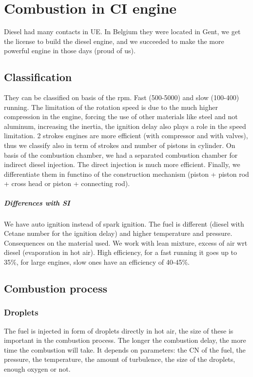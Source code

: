 
\chapter{Combustion in CI engine}
	Diesel had many contacts in UE. In Belgium they were located in Gent, we get the license to build the diesel engine, and we succeeded to make the more powerful engine in those days (proud of us). 
	
\section{Classification}
	They can be classified on basis of the rpm. Fast (500-5000) and slow (100-400) running. The limitation of the rotation speed is due to the much higher compression in the engine, forcing the use of other materials like steel and not aluminum, increasing the inertia, the ignition delay also plays a role in the speed limitation. 2 strokes engines are more efficient (with compressor and with valves), thus we classify also in term of strokes and number of pistons in cylinder. On basis of the combustion chamber, we had a separated combustion chamber for indirect diesel injection. The direct injection is much more efficient. Finally, we differentiate them in functino of the construction mechanism (piston + piston rod + cross head or piston + connecting rod). 
	
\paragraph{Differences with SI}
	We have auto ignition instead of spark ignition. The fuel is different (diesel with Cetane number for the ignition delay) and higher temperature and pressure. Consequences on the material used. We work with lean mixture, excess of air wrt diesel (evaporation in hot air). High efficiency, for a fast running it goes up to 35\%, for large engines, slow ones have an efficiency of 40-45\%. 
	
\section{Combustion process}
\subsection{Droplets}
	The fuel is injected in form of droplets directly in hot air, the size of these is important in the combustion process. The longer the combustion delay, the more time the combustion will take. It depends on parameters: the CN of the fuel, the pressure, the temperature, the amount of turbulence, the size of the droplets, enough oxygen or not. 
	
